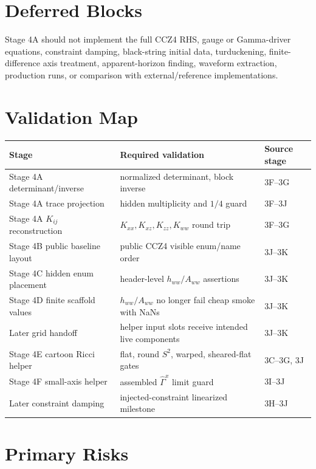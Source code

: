 \documentclass[11pt]{article}
\begin{document}
\section{Deferred Blocks}

Stage 4A should not implement the full CCZ4 RHS, gauge or Gamma-driver
equations, constraint damping, black-string initial data, turduckening,
finite-difference axis treatment, apparent-horizon finding, waveform
extraction, production runs, or comparison with external/reference
implementations.

\section{Validation Map}

\begin{center}
\begin{tabular}{lll}
\toprule
Stage & Required validation & Source stage \\
\midrule
Stage 4A determinant/inverse & normalized determinant, block inverse & 3F--3G \\
Stage 4A trace projection & hidden multiplicity and \(1/4\) guard & 3F--3J \\
Stage 4A \(K_{ij}\) reconstruction & \(K_{xx},K_{xz},K_{zz},K_{ww}\) round trip & 3F--3G \\
Stage 4B public baseline layout & public CCZ4 visible enum/name order & 3J--3K \\
Stage 4C hidden enum placement & header-level \(h_{ww}/A_{ww}\) assertions & 3J--3K \\
Stage 4D finite scaffold values & \(h_{ww}/A_{ww}\) no longer fail cheap smoke with NaNs & 3J--3K \\
Later grid handoff & helper input slots receive intended live components & 3J--3K \\
Stage 4E cartoon Ricci helper & flat, round \(S^2\), warped, sheared-flat gates & 3C--3G, 3J \\
Stage 4F small-axis helper & assembled \(\hat{\Gamma}^x\) limit guard & 3I--3J \\
Later constraint damping & injected-constraint linearized milestone & 3H--3J \\
\bottomrule
\end{tabular}
\end{center}

\section{Primary Risks}
\end{document}
